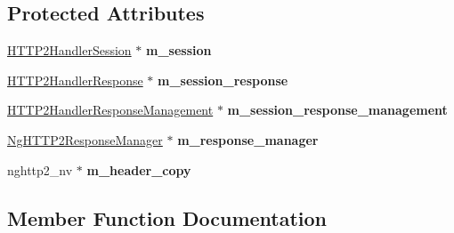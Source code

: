 \subsection*{Protected Attributes}
\begin{DoxyCompactItemize}
\item 
\mbox{\label{classNetwork_1_1HTTP2_1_1NgHTTP2Handler_a9029be1f977fe05fa61e6c594682bf87}} 
\hyperlink{structNetwork_1_1HTTP2_1_1HTTP2HandlerSession}{H\+T\+T\+P2\+Handler\+Session} $\ast$ {\bfseries m\+\_\+session}
\item 
\mbox{\label{classNetwork_1_1HTTP2_1_1NgHTTP2Handler_ab7de10d19b7ea978b7e55ecc6a0edc32}} 
\hyperlink{structNetwork_1_1HTTP2_1_1HTTP2HandlerResponse}{H\+T\+T\+P2\+Handler\+Response} $\ast$ {\bfseries m\+\_\+session\+\_\+response}
\item 
\mbox{\label{classNetwork_1_1HTTP2_1_1NgHTTP2Handler_a2cf599837cab36282fe43974cbc0083a}} 
\hyperlink{structNetwork_1_1HTTP2_1_1HTTP2HandlerResponseManagement}{H\+T\+T\+P2\+Handler\+Response\+Management} $\ast$ {\bfseries m\+\_\+session\+\_\+response\+\_\+management}
\item 
\mbox{\label{classNetwork_1_1HTTP2_1_1NgHTTP2Handler_addf66405fdf0ed01d607bf43e559d31e}} 
\hyperlink{classNetwork_1_1HTTP2_1_1NgHTTP2ResponseManager}{Ng\+H\+T\+T\+P2\+Response\+Manager} $\ast$ {\bfseries m\+\_\+response\+\_\+manager}
\item 
\mbox{\label{classNetwork_1_1HTTP2_1_1NgHTTP2Handler_a4b5d20e7eb960eb4e277cd1a07e2e9a3}} 
nghttp2\+\_\+nv $\ast$ {\bfseries m\+\_\+header\+\_\+copy}
\end{DoxyCompactItemize}


\subsection{Member Function Documentation}
\mbox{\label{classNetwork_1_1HTTP2_1_1NgHTTP2Handler_a9ab6663ad62320d8588733aa9f467ace}} 
